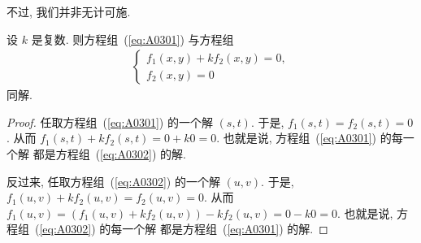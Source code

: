 \documentclass[%
    UTF8,%
    fontset=none,%
    punct=kaiming,%
    zihao=-4,%
    a4paper,%
    oneside,%
]{ctexbook}
\begin{document}
不过, 我们并非无计可施.

\begin{theorem}
    设 \(k\) 是复数.
    则方程组~(\ref{eq:A0301})
    与方程组
    \begin{align}
        \begin{cases}
            f_1 (x, y) + kf_2 (x, y) = 0, \\
            f_2 (x, y) = 0
        \end{cases}
        \label{eq:A0302}
    \end{align}
    同解.
\end{theorem}

\begin{proof}
    任取方程组~(\ref{eq:A0301}) 的一个解 \((s, t)\).
    于是, \(f_1 (s, t) = f_2 (s, t) = 0\).
    从而 \(f_1 (s, t) + kf_2 (s, t) = 0 + k0 = 0\).
    也就是说,
    方程组~(\ref{eq:A0301}) 的每一个解%
    都是方程组~(\ref{eq:A0302}) 的解.

    反过来, 任取方程组~(\ref{eq:A0302}) 的一个解 \((u, v)\).
    于是,
    \(f_1 (u, v) + k f_2 (u, v) = f_2 (u, v) = 0\).
    从而 \(f_1 (u, v)
    = (f_1 (u, v) + k f_2 (u, v)) - kf_2 (u, v)
    = 0 - k0 = 0\).
    也就是说,
    方程组~(\ref{eq:A0302}) 的每一个解%
    都是方程组~(\ref{eq:A0301}) 的解.
\end{proof}
\end{document}
